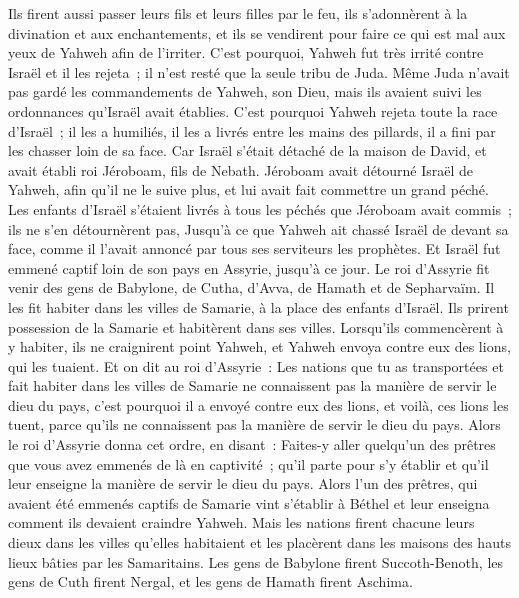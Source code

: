 \begin{multicols}{2}
Ils firent aussi passer leurs fils et leurs filles par le feu, ils s'adonnèrent à la divination et aux enchantements, et ils se vendirent pour faire ce qui est mal aux yeux de Yahweh afin de l'irriter.
C'est pourquoi, Yahweh fut très irrité contre Israël et il les rejeta~; il n'est resté que la seule tribu de Juda.
Même Juda n'avait pas gardé les commandements de Yahweh, son Dieu, mais ils avaient suivi les ordonnances qu'Israël avait établies.
C'est pourquoi Yahweh rejeta toute la race d'Israël~; il les a humiliés, il les a livrés entre les mains des pillards, il a fini par les chasser loin de sa face.
Car Israël s'était détaché de la maison de David, et avait établi roi Jéroboam, fils de Nebath. Jéroboam avait détourné Israël de Yahweh, afin qu'il ne le suive plus, et lui avait fait commettre un grand péché.
Les enfants d'Israël s'étaient livrés à tous les péchés que Jéroboam avait commis~; ils ne s'en détournèrent pas,
Jusqu'à ce que Yahweh ait chassé Israël de devant sa face, comme il l'avait annoncé par tous ses serviteurs les prophètes. Et Israël fut emmené captif loin de son pays en Assyrie, jusqu'à ce jour.
Le roi d'Assyrie fit venir des gens de Babylone, de Cutha, d'Avva, de Hamath et de Sepharvaïm. Il les fit habiter dans les villes de Samarie, à la place des enfants d'Israël. Ils prirent possession de la Samarie et habitèrent dans ses villes.
Lorsqu'ils commencèrent à y habiter, ils ne craignirent point Yahweh, et Yahweh envoya contre eux des lions, qui les tuaient.
Et on dit au roi d'Assyrie~: Les nations que tu as transportées et fait habiter dans les villes de Samarie ne connaissent pas la manière de servir le dieu du pays, c'est pourquoi il a envoyé contre eux des lions, et voilà, ces lions les tuent, parce qu'ils ne connaissent pas la manière de servir le dieu du pays.
Alors le roi d'Assyrie donna cet ordre, en disant~: Faites-y aller quelqu'un des prêtres que vous avez emmenés de là en captivité~; qu'il parte pour s'y établir et qu'il leur enseigne la manière de servir le dieu du pays.
Alors l'un des prêtres, qui avaient été emmenés captifs de Samarie vint s'établir à Béthel et leur enseigna comment ils devaient craindre Yahweh.
Mais les nations firent chacune leurs dieux dans les villes qu'elles habitaient et les placèrent dans les maisons des hauts lieux bâties par les Samaritains.
Les gens de Babylone firent Succoth-Benoth, les gens de Cuth firent Nergal, et les gens de Hamath firent Aschima.

\end{multicols}

